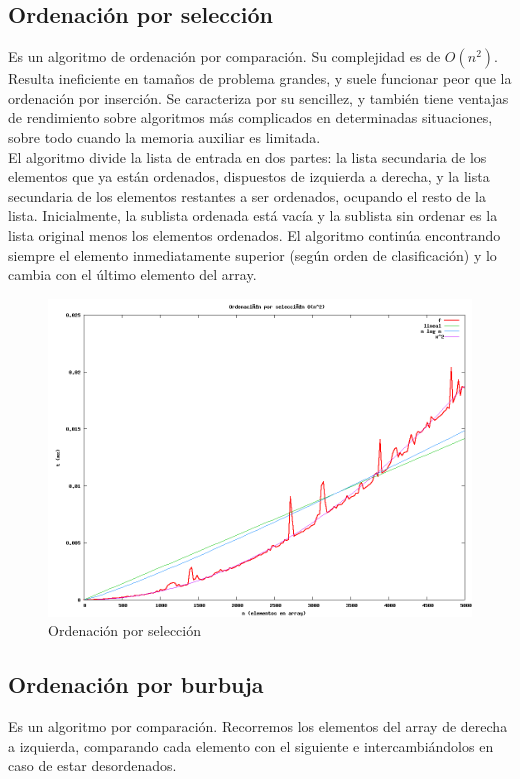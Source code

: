 \subsection{Ordenación por selecci\'on}
Es un algoritmo de ordenación por comparación. Su complejidad es de $O(n^2)$. Resulta ineficiente en tamaños de problema grandes, y suele funcionar peor que la ordenación por inserción. Se caracteriza por su sencillez, y también tiene ventajas de rendimiento sobre algoritmos más complicados en determinadas situaciones, sobre todo cuando la memoria auxiliar es limitada.\\
El algoritmo divide la lista de entrada en dos partes: la lista secundaria de los elementos que ya están ordenados, dispuestos de izquierda a derecha, y la lista secundaria de los elementos restantes a ser ordenados, ocupando el resto de la lista. Inicialmente, la sublista ordenada está vacía y la sublista sin ordenar es la lista original menos los elementos ordenados. El algoritmo continúa encontrando siempre el elemento inmediatamente superior (según orden de clasificación) y lo cambia con el último elemento del array.

	\begin{figure}[H]
	  \centering
	    \includegraphics[width=1.0\textwidth]{selection-sort.png}
	  \caption{Ordenación por selección}
	  \label{fig:selection}
	\end{figure}

\subsection{Ordenación por burbuja}
Es un algoritmo por comparación.  Recorremos los elementos del array de derecha a izquierda, comparando cada elemento con el siguiente e intercambiándolos en caso de estar desordenados.
